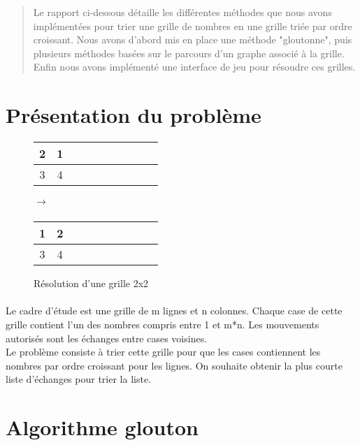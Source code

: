\documentclass[12pt]{article}
\begin{document}
\tableofcontents
\vspace{3000pt}

\begin{abstract}
    Le rapport ci-dessous détaille les différentes méthodes que nous avons implémentées pour trier une grille de nombres en une grille triée par ordre croissant. Nous avons d'abord mis en place une méthode "gloutonne", puis plusieurs méthodes basées sur le parcours d'un graphe associé à la grille. Enfin nous avons implémenté une interface de jeu pour résoudre ces grilles.
\end{abstract}

\section{Présentation du problème}


\begin{figure}[h]
    \centering
    \begin{tabular}{|*{10}{c|}}
        \hline
        2 & 1 \\
        \hline
        3  & 4 \\
        \hline
    \end{tabular}
    $\xrightarrow[]{}$
    \begin{tabular}{|*{10}{c|}}
        \hline
         1  & 2 \\
        \hline
         3  & 4 \\
        \hline
    \end{tabular}
    \caption{Résolution d'une grille 2x2}
    \label{fig:enter-label}
\end{figure}




\justifying \paragraph{}
Le cadre d'étude est une grille de m lignes et n colonnes. Chaque case de cette grille contient l'un des nombres compris entre 1 et m*n. Les mouvements autorisés sont les échanges entre cases voisines. \\
Le problème consiste à trier cette grille pour que les cases contiennent les nombres par ordre croissant pour les lignes. On souhaite obtenir la plus courte liste d'échanges pour trier la liste.

\section{Algorithme glouton}
\end{document}
